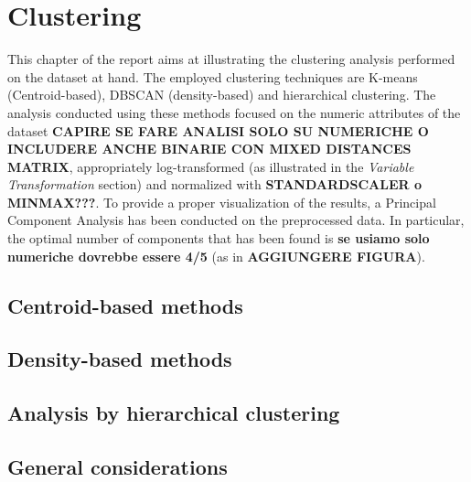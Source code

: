 \chapter{Clustering}
\label{ch:capitolo2}

This chapter of the report aims at illustrating the clustering analysis performed on the dataset at hand.
The employed clustering techniques are K-means (Centroid-based), DBSCAN (density-based) and hierarchical clustering.
The analysis conducted using these methods focused on the numeric attributes of the dataset \textbf{CAPIRE SE FARE ANALISI SOLO SU NUMERICHE O INCLUDERE ANCHE BINARIE CON MIXED DISTANCES
MATRIX}, appropriately log-transformed (as illustrated in the \textit{Variable Transformation} section) and normalized with \textbf{STANDARDSCALER o MINMAX???}.
To provide a proper visualization of the results, a Principal Component Analysis has been conducted on the preprocessed data. 
In particular, the optimal number of components that has been found is \textbf{se usiamo solo numeriche dovrebbe essere 4/5} (as in \textbf{AGGIUNGERE FIGURA}).


\section{Centroid-based methods}\label{sec:centroid_based}


\section{Density-based methods}\label{sec:density_based}


\section{Analysis by hierarchical clustering}\label{sec:hierarchical}


\section{General considerations}\label{sec:considerations}
